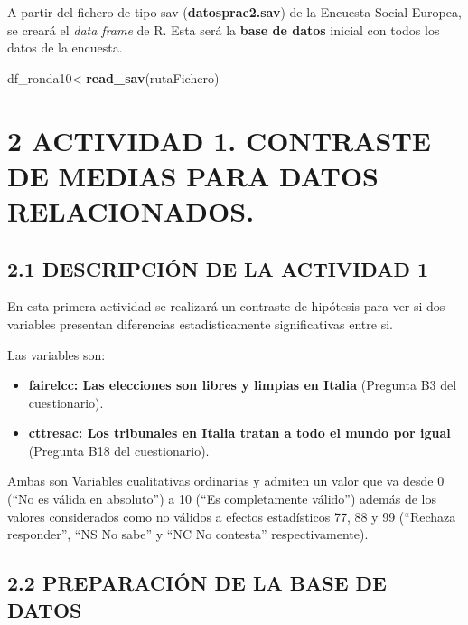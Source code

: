 \documentclass[
  12 pt,
  a4paper,
]{article}
\newenvironment{Shaded}{\begin{snugshade}}{\end{snugshade}}
\newcommand{\FunctionTok}[1]{\textcolor[rgb]{0.13,0.29,0.53}{\textbf{#1}}}
\newcommand{\NormalTok}[1]{#1}
\newcommand{\OtherTok}[1]{\textcolor[rgb]{0.56,0.35,0.01}{#1}}
\providecommand{\tightlist}{%
  \setlength{\itemsep}{0pt}\setlength{\parskip}{0pt}}
\begin{document}
A partir del fichero de tipo sav (\textbf{datosprac2.sav}) de la
Encuesta Social Europea, se creará el \emph{data frame} de R. Esta será
la \textbf{base de datos} inicial con todos los datos de la encuesta.

\begin{Shaded}
\begin{Highlighting}[]
\NormalTok{df\_ronda10}\OtherTok{\textless{}{-}}\FunctionTok{read\_sav}\NormalTok{(rutaFichero)}
\end{Highlighting}
\end{Shaded}

\newpage

\section{2 ACTIVIDAD 1. CONTRASTE DE MEDIAS PARA DATOS
RELACIONADOS.}\label{actividad-1.-contraste-de-medias-para-datos-relacionados.}

\subsection{2.1 DESCRIPCIÓN DE LA ACTIVIDAD
1}\label{descripciuxf3n-de-la-actividad-1}

En esta primera actividad se realizará un contraste de hipótesis para
ver si dos variables presentan diferencias estadísticamente
significativas entre si.

Las variables son:

\begin{itemize}
\tightlist
\item
  \textbf{fairelcc: Las elecciones son libres y limpias en Italia}
  (Pregunta B3 del cuestionario).
\item
  \textbf{cttresac: Los tribunales en Italia tratan a todo el mundo por
  igual} (Pregunta B18 del cuestionario).
\end{itemize}

Ambas son Variables cualitativas ordinarias y admiten un valor que va
desde 0 (``No es válida en absoluto'') a 10 (``Es completamente
válido'') además de los valores considerados como no válidos a efectos
estadísticos 77, 88 y 99 (``Rechaza responder'', ``NS No sabe'' y ``NC
No contesta'' respectivamente).

\subsection{2.2 PREPARACIÓN DE LA BASE DE
DATOS}\label{preparaciuxf3n-de-la-base-de-datos}
\end{document}
